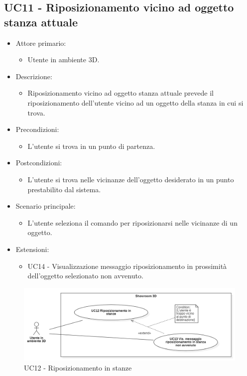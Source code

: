 \subsection{UC11 - Riposizionamento vicino ad oggetto stanza attuale}
\begin{itemize}

	\item Attore primario: 
	\begin{itemize}
		\item Utente in ambiente 3D.
	\end{itemize}
	\item Descrizione:
	\begin{itemize}
		\item Riposizionamento vicino ad oggetto stanza attuale prevede il riposizionamento dell'utente vicino ad un oggetto
della stanza in cui si trova.
	\end{itemize}
	
	\item Precondizioni:
	\begin{itemize}
		\item L'utente si trova in un punto di partenza.
	\end{itemize}
	
	\item Postcondizioni:
	\begin{itemize}
		\item L'utente si trova nelle vicinanze dell'oggetto desiderato in un punto prestabilito dal sistema.
	\end{itemize}
	
	\item Scenario principale:
	\begin{itemize}
		\item L'utente seleziona il comando per riposizionarsi nelle vicinanze di un oggetto.
	\end{itemize}

	\item Estensioni:
	\begin{itemize}
		\item UC14 - Visualizzazione messaggio riposizionamento in prossimità dell'oggetto selezionato non avvenuto.
	\end{itemize}
	
\end{itemize}

\pagebreak

\begin{figure}[H]
  \renewcommand{\thefigure}{14}
  \includegraphics[width=\linewidth]{./res/images/UC12-13.png}
  \caption{UC12 - Riposizionamento in stanze}
  \label{fig:UC 12 e UC13}
\end{figure}

